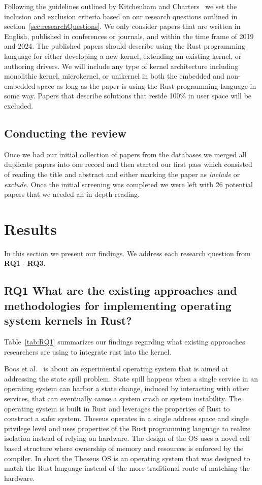\documentclass[sigconf]{acmart}
\begin{document}
Following the guidelines outlined by Kitchenham and Charters~\cite{Stuart2007-cc} we set the inclusion and exclusion criteria based on our research questions outlined in section~\ref{sec:researchQuestions}. We only consider papers that are written in English, published in conferences or journals, and within the time frame of 2019 and 2024. The published papers should describe using the Rust programming language for either developing a new kernel, extending an existing kernel, or authoring drivers. We will include any type of kernel architecture including monolithic kernel, microkernel, or unikernel in both the embedded and non-embedded space as long as the paper is using the Rust programming language in some way. Papers that describe solutions that reside 100\% in user space will be excluded.

\subsection{Conducting the review}

Once we had our initial collection of papers from the databases we merged all duplicate papers into one record and then started our first pass which consisted of reading the title and abstract and either marking the paper as \textit{include} or \textit{exclude}. Once  the initial screening was completed we were left with 26 potential papers that we needed an in depth reading.

\section{Results}

In this section we present our findings. We address each research question from \textbf{RQ1} - \textbf{RQ3}.

\subsection{RQ1 What are the existing approaches and methodologies for implementing operating system kernels in Rust?}

Table~\ref{tab:RQ1} summarizes our findings regarding what existing approaches researchers are using to integrate rust into the kernel.

Boos et al.~\cite{Boos2020-zh} is about an experimental operating system that is aimed at addressing the state spill problem. State spill happens when a single service in an operating system can harbor a state change, induced by interacting with other services, that can eventually cause a system crash or system instability. The operating system is built in Rust and leverages the properties of Rust to construct a safer system. Theseus operates in a single address space and single privilege level and uses properties of the Rust programming language to realize isolation instead of relying on hardware. The design of the OS uses a novel cell based structure where ownership of memory and resources is enforced by the compiler. In short the Theseus OS is an operating system that was designed to match the Rust language instead of the more traditional route of matching the hardware.
\end{document}
